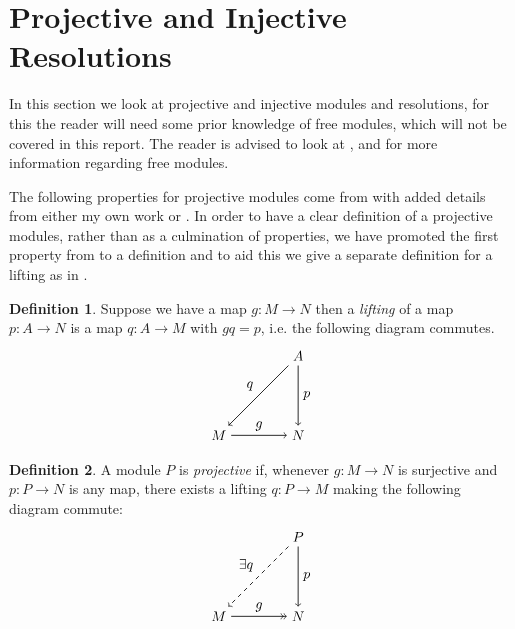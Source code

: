 \documentclass[11.5pt, twoside, a4paper, titlepage]{report}
\theoremstyle{definition}
\newtheorem{mydef}{Definition}[section]
\theoremstyle{plain}
\begin{document}

\section{Projective and Injective Resolutions}

In this section we look at projective and injective modules and resolutions, for this the reader will need some prior knowledge of free modules, which will not be covered in this report. The reader is advised to look at \cite{Stamm}, \cite{Weibel} and \cite{Rotman} for more information regarding free modules.
\vspace{0.5em}

The following properties for projective modules come from \cite{CB1} with added details from either my own work or \cite{Rotman}. In order to have a clear definition of a projective modules, rather than as a culmination of properties, we have promoted the first property from \cite{CB1} to a definition and to aid this we give a separate definition for a lifting as in \cite{Rotman}.

\begin{mydef}
Suppose we have a map $g:M \to N$ then a \emph{lifting} of a map $p:A \to N$ is a map $q:A\to M$ with $gq=p$, i.e. the following diagram commutes.
\begin{equation*}
\begin{tikzpicture}[->,-latex, auto, main path/.style={->, semithick}, main node/.style={}]
\node	[main node]		(1) at (0,0)		{$M$};
\node	[main node]		(2) at (2,0)		{$N$};
\node [main node]		(3) at (2,2)		{$A$};

\draw (1) edge [main path] node [auto] {$g$} (2);
\draw (3) edge [main path] node [auto] {$p$} (2);
\draw (3) edge [main path] node [auto, swap] {$q$} (1);
\end{tikzpicture}
\end{equation*}
\end{mydef}

\begin{mydef}
A module $P$ is \emph{projective} if, whenever $g:M\to N$ is surjective and $p:P\to N$ is any map, there exists a lifting $q:P \to M$ making the following diagram commute:
\begin{equation*}
\begin{tikzpicture}[->,-latex, auto, main path/.style={->, semithick}, main node/.style={}]
\node	[main node]		(1) at (0,0)		{$M$};
\node	[main node]		(2) at (2,0)		{$N$};
\node [main node]		(3) at (2,2)		{$P$};

\draw (1) edge [->>, semithick] node [auto] {$g$} (2);
\draw (3) edge [main path] node [auto] {$p$} (2);
\draw (3) edge [dashed, ->, semithick] node [auto, swap] {$\exists q$} (1);
\end{tikzpicture}
\end{equation*}
\end{mydef}
\end{document}
